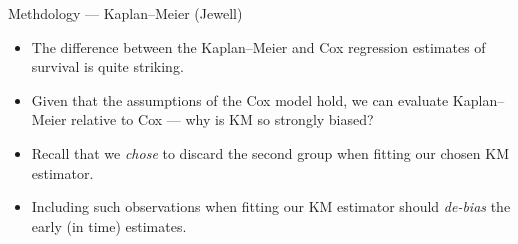 \documentclass[12pt,t]{beamer}
\begin{document}
\begin{frame}[c]{Methdology --- Kaplan--Meier (Jewell)}

\begin{center}
\begin{itemize}
  \itemsep12pt
  \item The difference between the Kaplan--Meier and Cox regression estimates of
    survival is quite striking.
  \item Given that the assumptions of the Cox model hold, we can evaluate
    Kaplan--Meier relative to Cox --- why is KM so strongly biased?
  \item Recall that we \textit{chose} to discard the second group when fitting
    our chosen KM estimator.
  \item Including such observations when fitting our KM estimator should
    \textit{de-bias} the early (in time) estimates.
\end{itemize}
\end{center}


\end{frame}

\end{document}
